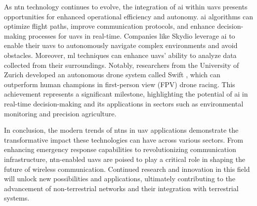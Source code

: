 As \gls{ntn} technology continues to evolve, the integration of \gls{ai} within \glspl{uav} presents opportunities for enhanced operational efficiency and autonomy. \gls{ai} algorithms can optimize flight paths, improve communication protocols, and enhance decision-making processes for \glspl{uav} in real-time. Companies like Skydio \autocite{skydioSkydioAutonomous} leverage \gls{ai} to enable their \glspl{uav} to autonomously navigate complex environments and avoid obstacles. Moreover, \gls{ml} techniques can enhance \glspl{uav}' ability to analyze data collected from their surroundings. Notably, researchers from the University of Zurich developed an autonomous drone system called Swift \autocite{Kaufmann2023ChampionlevelDR}, which can outperform human champions in first-person view (FPV) drone racing. This achievement represents a significant milestone, highlighting the potential of \gls{ai} in real-time decision-making and its applications in sectors such as environmental monitoring and precision agriculture.

In conclusion, the modern trends of \glspl{ntn} in \gls{uav} applications demonstrate the transformative impact these technologies can have across various sectors. From enhancing emergency response capabilities to revolutionizing communication infrastructure, \gls{ntn}-enabled \glspl{uav} are poised to play a critical role in shaping the future of wireless communication. Continued research and innovation in this field will unlock new possibilities and applications, ultimately contributing to the advancement of non-terrestrial networks and their integration with terrestrial systems.

